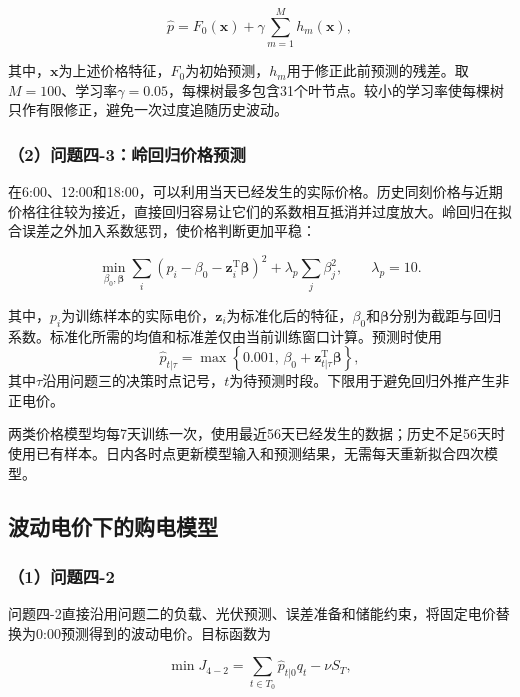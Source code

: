 \begin{equation}
\hat{p}
=
F_0(\mathbf{x})
+
\gamma
\sum_{m=1}^{M}
h_m(\mathbf{x}),
\end{equation}

其中，$\mathbf{x}$为上述价格特征，$F_0$为初始预测，$h_m$用于修正此前预测的残差。取$M=100$、学习率$\gamma=0.05$，每棵树最多包含31个叶节点。较小的学习率使每棵树只作有限修正，避免一次过度追随历史波动。

\subsubsection*{（2）问题四-3：岭回归价格预测}

在6:00、12:00和18:00，可以利用当天已经发生的实际价格。历史同刻价格与近期价格往往较为接近，直接回归容易让它们的系数相互抵消并过度放大。岭回归在拟合误差之外加入系数惩罚，使价格判断更加平稳：

\begin{equation}
\min_{\beta_0,\boldsymbol{\beta}}
\sum_i
\left(
p_i-\beta_0-\mathbf{z}_i^{\mathrm T}\boldsymbol{\beta}
\right)^2
+
\lambda_p
\sum_j\beta_j^2,
\qquad
\lambda_p=10.
\end{equation}

其中，$p_i$为训练样本的实际电价，$\mathbf{z}_i$为标准化后的特征，$\beta_0$和$\boldsymbol{\beta}$分别为截距与回归系数。标准化所需的均值和标准差仅由当前训练窗口计算。预测时使用
\begin{equation}
\hat p_{t|\tau}=\max\left\{0.001,\,\beta_0+\mathbf{z}_{t|\tau}^{\mathrm T}\boldsymbol{\beta}\right\},
\end{equation}
其中$\tau$沿用问题三的决策时点记号，$t$为待预测时段。下限用于避免回归外推产生非正电价。

两类价格模型均每7天训练一次，使用最近56天已经发生的数据；历史不足56天时使用已有样本。日内各时点更新模型输入和预测结果，无需每天重新拟合四次模型。

\subsection{波动电价下的购电模型}

\subsubsection*{（1）问题四-2}

问题四-2直接沿用问题二的负载、光伏预测、误差准备和储能约束，将固定电价替换为0:00预测得到的波动电价。目标函数为

\begin{equation}
\min J_{4-2}
=
\sum_{t\in T_0}
\hat{p}_{t|0}q_t
-
\nu S_T,
\end{equation}


